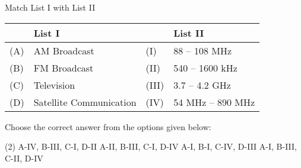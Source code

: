 \item Match List I with List II

\begin{center}
    \renewcommand{\arraystretch}{2}
    \begin{table}[h]
        \centering
        \begin{tabular}{p{0.25cm}p{8cm}|p{0.25cm}p{5cm}}
        \hline
        & List I & & List II \\
        \hline
        (A) & AM Broadcast & (I) & 88 -- 108 MHz \\
        (B) & FM Broadcast & (II) & 540 -- 1600 kHz \\
        (C) & Television & (III) & 3.7 -- 4.2 GHz \\
        (D) & Satellite Communication & (IV) & 54 MHz -- 890 MHz \\
        \hline
        \end{tabular}
    \end{table}
\end{center}

Choose the correct answer from the options given below:

\begin{tasks}(2)
    \task A-IV, B-III, C-I, D-II
    \task A-II, B-III, C-I, D-IV
    \task A-I, B-I, C-IV, D-III
    \task A-I, B-III, C-II, D-IV
\end{tasks}